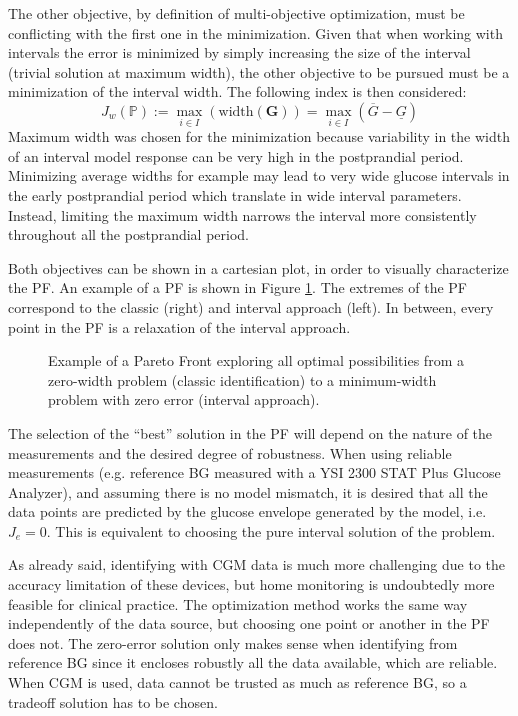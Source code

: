 The other objective, by definition of multi-objective optimization, must be conflicting with the first one in the minimization. Given that when working with intervals the error is minimized by simply increasing the size of the interval (trivial solution at maximum width), the other objective to be pursued must be a minimization of the interval width. The following index is then considered:
	\begin{equation}
	J_w(\mathbb{P}):=\max_{i \in I}\left( \text{width} \left( \boldsymbol{G} \right) \right) = \max_{i \in I} \left( \overline{G}- \underline{G}\right)
	\label{eq:jota2}
	\end{equation}	
Maximum width was chosen for the minimization because variability in the width of an interval model response can be very high in the postprandial period. Minimizing average widths for example may lead to very wide glucose intervals in the early postprandial period which translate in wide interval parameters. Instead, limiting the maximum width narrows the interval more consistently throughout all the postprandial period.

Both objectives can be shown in a cartesian plot, in order to visually characterize the PF. An example of a PF is shown in Figure \ref{fig:paretoYSI}. The extremes of the PF correspond to the classic (right) and interval approach (left). In between, every point in the PF is a relaxation of the interval approach. 

\begin{figure}[hbt]
\centering
{}\caption{Example of a Pareto Front exploring all optimal possibilities from a zero-width problem (classic identification) to a minimum-width problem with zero error (interval approach).}
\label{fig:paretoYSI}
\end{figure}

The selection of the ``best'' solution in the PF will depend on the nature of the measurements and the desired degree of robustness. When using reliable measurements (e.g. reference BG measured with a YSI 2300 STAT Plus\texttrademark{} Glucose Analyzer), and assuming there is no model mismatch, it is desired that all the data points are predicted by the glucose envelope generated by the model, i.e. $J_e=0$. This is equivalent to choosing the pure interval solution of the problem. 

As already said, identifying with CGM data is much more challenging due to the accuracy limitation of these devices, but home monitoring is undoubtedly more feasible for clinical practice. The optimization method works the same way independently of the data source, but choosing one point or another in the PF does not. The zero-error solution only makes sense when identifying from reference BG since it encloses robustly all the data available, which are reliable. When CGM is used, data cannot be trusted as much as reference BG, so a tradeoff solution has to be chosen.

